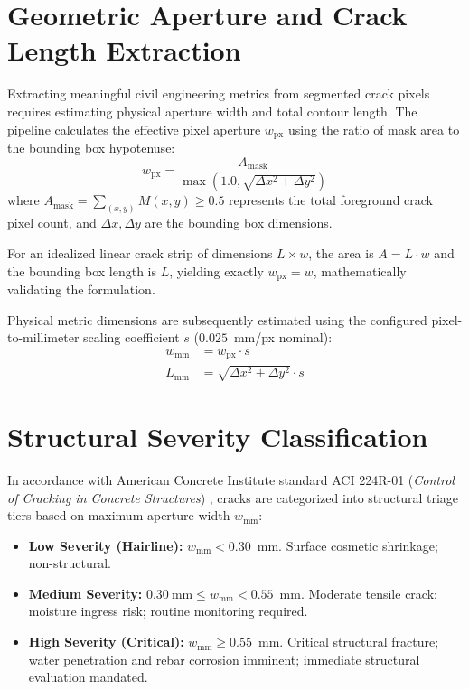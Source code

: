 \documentclass[12pt,a4paper,oneside]{report}
\begin{document}
\section{Geometric Aperture and Crack Length Extraction}
Extracting meaningful civil engineering metrics from segmented crack pixels requires estimating physical aperture width and total contour length. The pipeline calculates the effective pixel aperture $w_{\text{px}}$ using the ratio of mask area to the bounding box hypotenuse:
\begin{equation}
w_{\text{px}} = \frac{A_{\text{mask}}}{\max\left(1.0, \sqrt{\Delta x^2 + \Delta y^2}\right)}
\label{eq:aperture}
\end{equation}
where $A_{\text{mask}} = \sum_{(x,y)} M(x, y) \ge 0.5$ represents the total foreground crack pixel count, and $\Delta x, \Delta y$ are the bounding box dimensions. 

For an idealized linear crack strip of dimensions $L \times w$, the area is $A = L \cdot w$ and the bounding box length is $L$, yielding exactly $w_{\text{px}} = w$, mathematically validating the formulation.

Physical metric dimensions are subsequently estimated using the configured pixel-to-millimeter scaling coefficient $s$ ($0.025$~mm/px nominal):
\begin{align}
  w_{\text{mm}} &= w_{\text{px}} \cdot s \\
  L_{\text{mm}} &= \sqrt{\Delta x^2 + \Delta y^2} \cdot s
\end{align}

\section{Structural Severity Classification}
In accordance with American Concrete Institute standard ACI 224R-01 (\emph{Control of Cracking in Concrete Structures}) \cite{aci224}, cracks are categorized into structural triage tiers based on maximum aperture width $w_{\text{mm}}$:
\begin{itemize}
  \item \textbf{Low Severity (Hairline):} $w_{\text{mm}} < 0.30$~mm. Surface cosmetic shrinkage; non-structural.
  \item \textbf{Medium Severity:} $0.30~\text{mm} \le w_{\text{mm}} < 0.55$~mm. Moderate tensile crack; moisture ingress risk; routine monitoring required.
  \item \textbf{High Severity (Critical):} $w_{\text{mm}} \ge 0.55$~mm. Critical structural fracture; water penetration and rebar corrosion imminent; immediate structural evaluation mandated.
\end{itemize}
\end{document}
